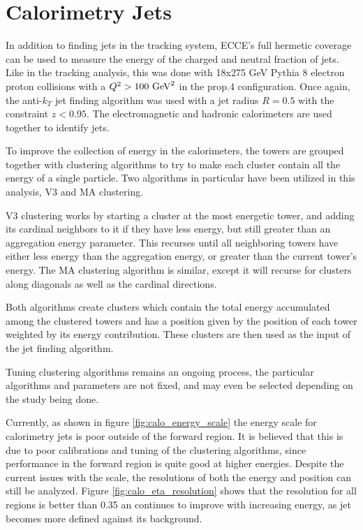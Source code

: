 \section{Calorimetry Jets}
\label{calo_jets}

In addition to finding jets in the tracking system, ECCE's full hermetic coverage can be used to measure the energy of the charged and neutral fraction of jets.  Like in the tracking analysis, this was done with 18x275 GeV Pythia 8 electron proton collisions with a $Q^2>100\hbox{ GeV}^2$ in the prop.4 configuration.  Once again, the anti-$k_T$ jet finding algorithm was used with a jet radius $R=0.5$ with the constraint $z<0.95$.  The electromagnetic and hadronic calorimeters are used together to identify jets.

To improve the collection of energy in the calorimeters, the towers are grouped together with clustering algorithms to try to make each cluster contain all the energy of a single particle.  Two algorithms in particular have been utilized in this analysis, V3 and MA clustering.

V3 clustering works by starting a cluster at the most energetic tower, and adding its cardinal neighbors to it if they have less energy, but still greater than an aggregation energy parameter.  This recurses until all neighboring towers have either less energy than the aggregation energy, or greater than the current tower's energy.  The MA clustering algorithm is similar, except it will recurse for clusters along diagonals as well as the cardinal directions.  

Both algorithms create clusters which contain the total energy accumulated among the clustered towers and has a position given by the position of each tower weighted by its energy contribution.  These clusters are then used as the input of the jet finding algorithm.  

Tuning clustering algorithms remains an ongoing process, the particular algorithms and parameters are not fixed, and may even be selected depending on the study being done. 

Currently, as shown in figure \ref{fig:calo_energy_scale} the energy scale for calorimetry jets is poor outside of the forward region.  It is believed that this is due to poor calibrations and tuning of the clustering algorithms, since performance in the forward region is quite good at higher energies.  Despite the current issues with the scale, the resolutions of both the energy and position can still be analyzed.  Figure \ref{fig:calo_eta_resolution} shows that the resolution for all regions is better than 0.35 an continues to improve with increasing energy, as jet becomes more defined against its background.  

